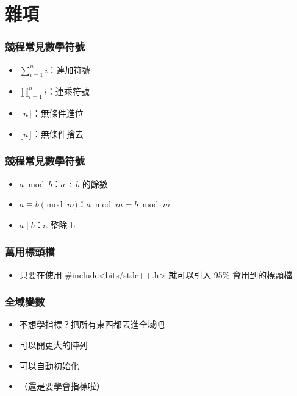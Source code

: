 \documentclass[mathserif]{beamer}
\begin{document}
\section{雜項}

\begin{frame}
    \frametitle{競程常見數學符號}
    \begin{itemize}
        \item $\displaystyle\sum_{i=1}^{n} i$：連加符號
        \item $\displaystyle\prod_{i=1}^{n} i$：連乘符號
        \vspace{0.5cm}
        \item<2-> $\lceil n \rceil$：無條件進位
        \item<2-> $\lfloor n \rfloor$：無條件捨去
    \end{itemize}
\end{frame}

\begin{frame}
    \frametitle{競程常見數學符號}
    \begin{itemize}
        \item $a \bmod b$：$a \div b$ 的餘數
        \item $a \equiv b \pmod{m}$：$a \bmod m = b \bmod m$
        \item $a \mid b$：a 整除 b
    \end{itemize}
\end{frame}

\begin{frame}
    \frametitle{萬用標頭檔}
    \begin{itemize}
        \item 只要在使用 \#include<bits/stdc++.h> 就可以引入 95\% 會用到的標頭檔
    \end{itemize}
\end{frame}

\begin{frame}
    \frametitle{全域變數}
    \begin{itemize}
        \item 不想學指標？把所有東西都丟進全域吧
        \item 可以開更大的陣列
        \item 可以自動初始化
        \item （還是要學會指標啦）
    \end{itemize}
\end{frame}
\end{document}
